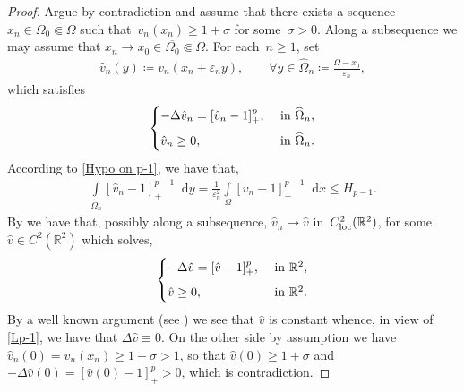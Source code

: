 \documentclass[10pt]{amsart}
\newcommand{\R}{\mathbb{R}}
\newcommand{\dd}{\mathop{}\!\mathrm{d}}
\newcommand{\eps}{\varepsilon}
\def\R{\mathbb{R}}
\renewcommand{\to}{\rightarrow}
\begin{document}
    \begin{proof}
        Argue by contradiction and assume that there exists a sequence~$x_n\in \Omega_0\Subset \Omega$ such that~$v_n(x_n)\geq 1+\sigma$ for some~$\sigma >0$.
        Along a subsequence we may assume that $x_n\to x_0 \in \overline{\Omega_0}\Subset \Omega$.
        For each~$n\geq 1$, set
        \begin{align*}
            \hat{v}_n(y)\coloneqq v_n(x_n + \eps_n y), \qquad
            \forall y\in \widehat{\Omega}_n\coloneqq \frac{\Omega-x_0}{\eps_n},
        \end{align*}
        which satisfies
        \begin{align*}
            \begin{cases}
                -\Delta \hat{v}_n=[\hat{v}_n-1]_+^p,  & \mbox{ in } \widehat{\Omega}_n, \vspace{2mm} \\
                \hat{v}_n\geq 0, & \mbox{ in } \widehat{\Omega}_n.
            \end{cases}
        \end{align*}
        According to \eqref{Hypo on p-1}, we have that,
        \begin{align}\label{Lp-1}
            \int\limits_{\widehat{\Omega}_n} [\hat{v}_n-1]_+^{p-1}\dd{y}
            =\frac{1}{\eps_n^2}\int\limits_{\Omega} [v_n-1]_+^{p-1}\dd{x} \leq H_{p-1}.
        \end{align}
        By \cite[Theorem 6.1]{BJW} we have that, possibly along a subsequence, $\hat{v}_n\to \hat{v}$ in~$C^2_{\rm loc}(\R^2)$, for some~$\hat{v}\in C^2(\R^2)$ which solves,
        \begin{align*}
            \begin{cases}
                -\Delta\hat{v}=[\hat{v}-1]_+^p, & \mbox{ in } \R^2, \vspace{2mm} \\
                \hat{v}\geq 0, & \mbox{ in } \R^2.
            \end{cases}
        \end{align*}
        By a well known argument (see \cite{MitP}) we see that $\hat{v}$ is constant whence, in view of \eqref{Lp-1}, we have that $\Delta\hat{v}\equiv 0$.
        On the other side by assumption we have $\hat{v}_n(0)=v_n(x_n)\geq 1+\sigma>1$, so that
        $\hat{v}(0)\geq 1+\sigma$ and $-\Delta\hat{v}(0)=[\hat{v}(0)-1]_+^p>0$, which is contradiction.
    \end{proof}

\bigskip
\end{document}
